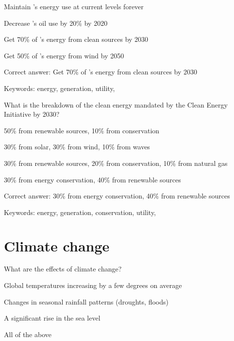 \begin{answer}
	\item Maintain \Hawaii's energy use at current levels forever
	\item Decrease \Hawaii's oil use by 20\% by 2020
	\item Get 70\% of \Hawaii's energy from clean sources by 2030
	\item Get 50\% of \Hawaii's energy from wind by 2050
\end{answer}

Correct answer: Get 70\% of \Hawaii's energy from clean sources by 2030

Keywords: energy, generation, utility, \Hawaii

\begin{question}
	\item What is the breakdown of the clean energy mandated by the \Hawaii Clean Energy Initiative by 2030?
\end{question}

\begin{answer}
	\item 50\% from renewable sources, 10\% from conservation
	\item 30\% from solar, 30\% from wind, 10\% from waves
	\item 30\% from renewable sources, 20\% from conservation, 10\% from natural gas
	\item 30\% from energy conservation, 40\% from renewable sources
\end{answer}

Correct answer: 30\% from energy conservation, 40\% from renewable sources

Keywords: energy, generation, conservation, utility, \Hawaii

\section{Climate change}

\begin{question}
	\item What are the effects of climate change?
\end{question}

\begin{answer}
	\item Global temperatures increasing by a few degrees on average
	\item Changes in seasonal rainfall patterns (droughts, floods)
	\item A significant rise in the sea level
	\item All of the above
\end{answer}

